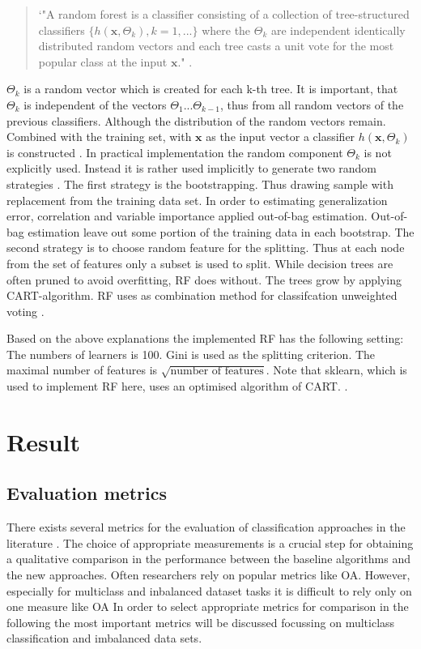 \documentclass[12pt, a4paper, titlepage]{article}
\begin{document}
\begin{quote}
`"A random forest is a classifier consisting of a collection of tree-structured classifiers $\{h(\textbf{x}, \Theta_k), k = 1, ...\}$ where the ${\Theta_k}$ are independent identically distributed random vectors and each tree casts a unit vote for the most popular class at the input $\textbf{x}$." \citep[6]{breiman2001}. 
\end{quote}
$\Theta_k$ is a random vector which is created for each k-th tree. It is important, that $\Theta_k$ is independent of the vectors $\Theta_1...\Theta_{k-1}$, thus from all random vectors of the previous classifiers. Although the distribution of the random vectors remain. Combined with the training set, with $\textbf{x}$ as the input vector a classifier $h(\textbf{x}, \Theta_k)$ is constructed \citep{breiman2001}. In practical implementation the random component $\Theta_k$ is not explicitly used. Instead it is rather used implicitly to generate two random strategies \citep{cutler2012}. The first strategy is the bootstrapping. Thus drawing sample with replacement from the training data set. In order to estimating generalization error, correlation and variable importance \citet{breiman2001} applied out-of-bag estimation. Out-of-bag estimation leave out some portion of the training data in each bootstrap. The second strategy is to choose random feature for the splitting. Thus at each node from the set of features only a subset is used to split. While decision trees are often pruned to avoid overfitting, \ac{RF} does without. The trees grow by applying \ac{CART}-algorithm. \ac{RF} uses as combination method for classifcation unweighted voting \citep{cutler2012}.

Based on the above explanations the implemented \ac{RF} has the following setting: The numbers of learners is 100. Gini is used as the splitting criterion. The maximal number of features is $\sqrt{\text{number of features}}$. Note that sklearn, which is used to implement \ac{RF} here, uses an optimised algorithm of \ac{CART}. \citep{scikit-learn}.

 

\section{Result}
\subsection{Evaluation metrics}
There exists several metrics for the evaluation of classification approaches in the literature \citep{Fatourechi2008}. The choice of appropriate measurements is a crucial step for obtaining a qualitative comparison in the performance between the baseline algorithms and the new approaches. Often researchers rely on popular metrics like \ac{OA}. However, especially for multiclass and inbalanced dataset tasks it is difficult to rely only on one measure like \ac{OA} In order to select appropriate metrics for comparison in the following the most important metrics will be discussed focussing on multiclass classification and imbalanced data sets. 
\end{document}
